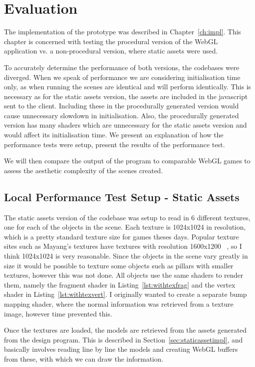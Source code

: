 \chapter{Evaluation}
\label{ch:evaluation}
The implementation of the prototype was described in Chapter~\ref{ch:impl}.
This chapter is concerned with testing the procedural version of the WebGL application vs. a non-procedural version, where static assets were used.

To accurately determine the performance of both versions, the codebases were diverged.
When we speak of performance we are considering initialisation time only, as when running the scenes are identical and will perform identically.
This is necessary as for the static assets version, the assets are included in the javascript sent to the client.
Including these in the procedurally generated version would cause unnecessary slowdown in initialisation.
Also, the procedurally generated version has many shaders which are unnecessary for the static assets version and would affect its initialisation time.
We present an explanation of how the performance tests were setup, present the results of the performance test.

We will then compare the output of the program to comparable WebGL games to assess the aesthetic complexity of the scenes created.

\section{Local Performance Test Setup - Static Assets}
The static assets version of the codebase was setup to read in 6 different textures, one for each of the objects in the scene.
Each texture is 1024x1024 in resolution, which is a pretty standard texture size for games theses days.
Popular texture sites such as Mayang's textures have textures with resolution 1600x1200 ~\cite{web:mayangtex}, so I think 1024x1024 is very reasonable.
Since the objects in the scene vary greatly in size it would be possible to texture some objects such as pillars with smaller textures, however this was not done.
All objects use the same shaders to render them, namely the fragment shader in Listing~\ref{lst:withtexfrag} and the vertex shader in Listing~\ref{lst:withtexvert}.
I originally wanted to create a separate bump mapping shader, where the normal information was retrieved from a texture image, however time prevented this.

Once the textures are loaded, the models are retrieved from the assets generated from the design program.
This is described in Section~\ref{sec:staticassetimpl}, and basically involves reading line by line the models and creating WebGL buffers from these, with which we can draw the information.

